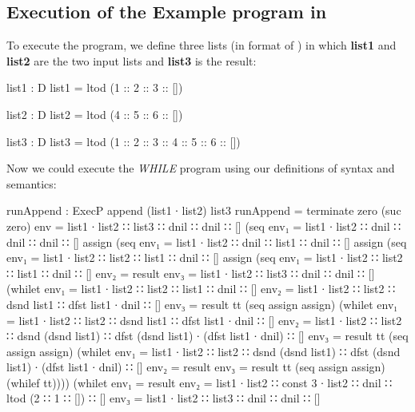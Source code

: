 \subsection{Execution of the Example \WHILE program in \Agda}
To execute the program, we define three lists (in format of ) in which \textbf{list1} and \textbf{list2} are the two input lists and \textbf{list3} is the result:
\begin{code}
list1 : D
list1 = ltod (1 :: 2 :: 3 :: [])

list2 : D
list2 = ltod (4 :: 5 :: 6 :: [])

list3 : D
list3 = ltod (1 :: 2 :: 3 :: 4 :: 5 :: 6 :: [])
\end{code}
Now we could execute the \textit{WHILE} program using our definitions of syntax and semantics:
\begin{code}[fontsize=\footnotesize]
runAppend : ExecP append (list1 ∙ list2) list3
runAppend = terminate zero (suc zero)
                 {env = list1 ∙ list2 ∷ list3 ∷ dnil ∷ dnil ∷ []}
            (seq {env₁ = list1 ∙ list2 ∷ dnil ∷ dnil ∷ dnil ∷ []}
             assign
            (seq {env₁ = list1 ∙ list2 ∷ dnil ∷ list1 ∷ dnil ∷ []}
             assign
            (seq {env₁ = list1 ∙ list2 ∷ list2 ∷ list1 ∷ dnil ∷ []}
             assign
            (seq {env₁ = list1 ∙ list2 ∷ list2 ∷ list1 ∷ dnil ∷ []}
                 {env₂ = result}
                 {env₃ =  list1 ∙ list2 ∷ list3 ∷ dnil ∷ dnil ∷ []}
            (whilet {env₁ = list1 ∙ list2 ∷ list2 ∷ list1 ∷ dnil ∷ []}
                    {env₂ = list1 ∙ list2 ∷ list2 ∷
                            dsnd list1 ∷ dfst list1 ∙ dnil ∷ []}
                    {env₃ = result}
             tt 
            (seq assign assign)
            (whilet {env₁ = list1 ∙ list2 ∷ list2 ∷
                            dsnd list1 ∷ dfst list1 ∙ dnil ∷ []}
                    {env₂ = list1 ∙ list2 ∷ list2 ∷ dsnd (dsnd list1) ∷
                            dfst (dsnd list1) ∙ (dfst list1 ∙ dnil) ∷ []}
                    {env₃ = result}
             tt
            (seq assign assign)
            (whilet {env₁ = list1 ∙ list2 ∷ list2 ∷ dsnd (dsnd list1) ∷
                            dfst (dsnd list1) ∙ (dfst list1 ∙ dnil) ∷ []}
                    {env₂ = result}
                    {env₃ = result}
             tt
            (seq assign assign)
            (whilef tt))))
            (whilet {env₁ = result}
                    {env₂ = list1 ∙ list2 ∷ const 3 ∙ list2 ∷
                            dnil ∷ ltod (2 ∷ 1 ∷ []) ∷ []}
                    {env₃ = list1 ∙ list2 ∷ list3 ∷ dnil ∷ dnil ∷ []}

\end{code}
